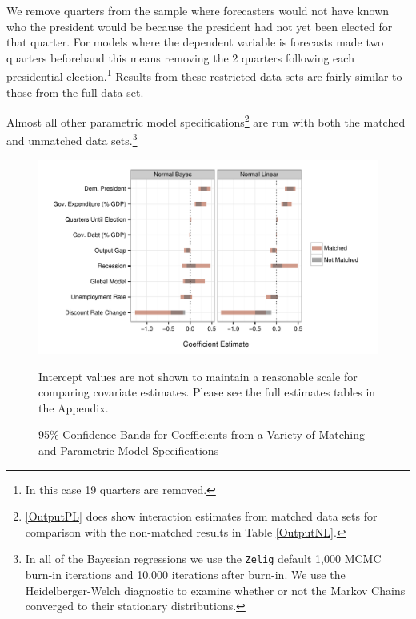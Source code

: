 \documentclass[a4paper]{article}\usepackage{graphicx, color}
\newenvironment{knitrout}{}{} %
\begin{document}
We remove quarters from the sample where forecasters would not have known who the president would be because the president had not yet been elected for that quarter. For models where the dependent variable is forecasts made two quarters beforehand this means removing the 2 quarters following each presidential election.\footnote{In this case 19 quarters are removed.} Results from these restricted data sets are fairly similar to those from the full data set.

Almost all other parametric model specifications\footnote{\ref{OutputPL} does show interaction estimates from matched data sets for comparison with the non-matched results in Table \ref{OutputNL}.} are run with both the matched and unmatched data sets.\footnote{In all of the Bayesian regressions we use the {\tt{Zelig}} default 1,000 MCMC burn-in iterations and 10,000 iterations after burn-in. We use the Heidelberger-Welch diagnostic to examine whether or not the Markov Chains converged to their stationary distributions.}




\begin{figure}[t]
    \caption{95\% Confidence Bands for Coefficients from a Variety of Matching and Parametric Model Specifications}
    \label{CoefComparePlots}
    \begin{center}

\begin{knitrout}
\color{fgcolor}

{\centering \includegraphics[width=0.95\linewidth]{figure/CoefComparePlots} 

}



\end{knitrout}

    \end{center}
    \begin{singlespace}
        {\scriptsize{Intercept values are not shown to maintain a reasonable scale for comparing covariate estimates. Please see the full estimates tables in the Appendix.}}
    \end{singlespace}
\end{figure}
\end{document}
